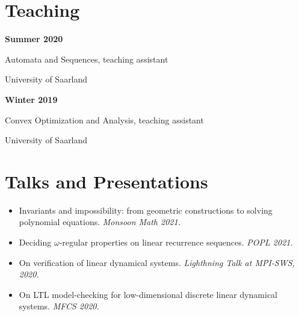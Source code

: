 \documentclass{article}
\begin{document}
	\section*{Teaching}
	\noindent\begin{minipage}{0.3\textwidth}
		\hspace{0.5cm} \textbf{Summer 2020}
	\end{minipage}
	\begin{minipage}{0.7\textwidth}
		Automata and Sequences, teaching assistant 
		
		University of Saarland
	\end{minipage}
	
	\bigskip
	
	\noindent\begin{minipage}{0.3\textwidth}
		\hspace{0.5cm} \textbf{Winter 2019}
	\end{minipage}
	\begin{minipage}{0.7\textwidth}
		Convex Optimization and Analysis, teaching assistant 
		
		University of Saarland
	\end{minipage}

	\section*{Talks and Presentations}
	\begin{itemize}
		\item Invariants and impossibility: from geometric constructions to solving polynomial equations. \emph{Monsoon Math 2021.}
		\item Deciding $\omega$-regular properties on linear recurrence sequences. \emph{POPL 2021.}
		\item On verification of linear dynamical systems. \emph{Lighthning Talk at MPI-SWS, 2020.}
		\item  On LTL model-checking for low-dimensional discrete
		linear dynamical systems. \emph{MFCS 2020.}
	\end{itemize}
\end{document}
